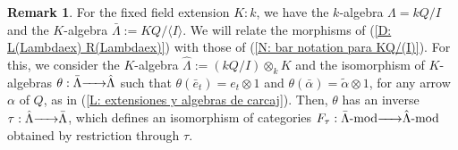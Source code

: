 \documentclass{article}
\theoremstyle{definition}
\newtheorem{remark}[theorem]{Remark}
\newcommand{\g}{\hbox{-}}
\renewcommand{\mod}{{\rm mod }}
\newcommand{\rightmap}[1]{\smash{\mathop{\hbox to 
20pt{\rightarrowfill}}\limits^{#1}}}
\begin{document}
\begin{remark}\label{R: comparing bar morphisms with morphisms tensor id} For the fixed field extension $K:k$, we have the $k$-algebra $\Lambda=kQ/I$ and the $K$-algebra 
$\bar{\Lambda}:=KQ/\langle I\rangle$. We will relate the morphisms of (\ref{D: L(Lambdaex) R(Lambdaex)}) with those of (\ref{N: bar notation para KQ/(I)}). For this, we consider the $K$-algebra  $\hat{\Lambda}:=(kQ/I)\otimes_k K$ and the isomorphism of $K$-algebras $\theta:\bar{\Lambda}\rightmap{}\hat{\Lambda}$ such that $\theta(\bar{e}_t)=e_t\otimes 1$ and $\theta(\bar{\alpha})=\tilde{\alpha}\otimes 1$, for any arrow $\alpha$ of $Q$, as in (\ref{L: extensiones y algebras de carcaj}). Then, $\theta$ has an inverse   $\tau: \hat{\Lambda}\rightmap{}\bar{\Lambda}$, which defines 
an isomorphism of categories $F_\tau:\bar{\Lambda}\g\mod\rightmap{}\hat{\Lambda}\g\mod$ obtained by restriction through $\tau$. 


\end{remark}
\end{document}
